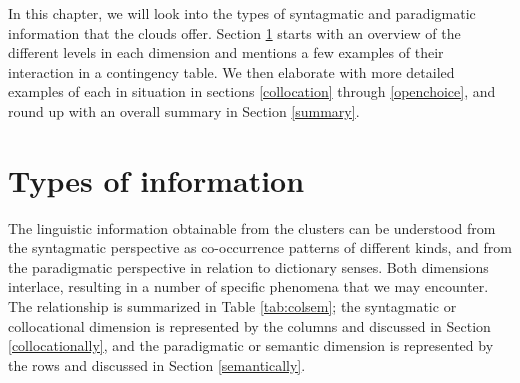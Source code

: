 \documentclass[
]{book}
\begin{document}
In this chapter, we will look into the types of syntagmatic and paradigmatic information that the clouds offer. Section \ref{infotypes} starts with an overview of the different levels in each dimension and mentions a few examples of their interaction in a contingency table. We then elaborate with more detailed examples of each in situation in sections \ref{collocation} through \ref{openchoice}, and round up with an overall summary in Section \ref{summary}.

\hypertarget{infotypes}{%
\section{Types of information}\label{infotypes}}

The linguistic information obtainable from the clusters can be understood from the syntagmatic perspective as co-occurrence patterns of different kinds, and from the paradigmatic perspective in relation to dictionary senses. Both dimensions interlace, resulting in a number of specific phenomena that we may encounter. The relationship is summarized in Table \ref{tab:colsem}; the syntagmatic or collocational dimension is represented by the columns and discussed in Section \ref{collocationally}, and the paradigmatic or semantic dimension is represented by the rows and discussed in Section \ref{semantically}.
\end{document}
